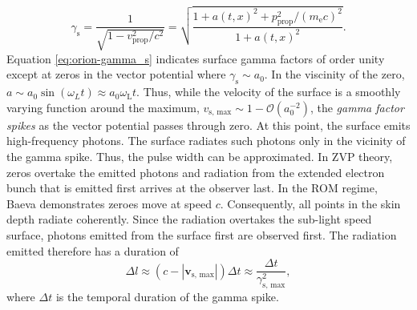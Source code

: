 \begin{equation}\label{eq:orion-gamma_s}
	\gamma_\mathrm{s} = \frac{1}{\sqrt{1-v_\mathrm{prop}^2/c^2}} = \sqrt{ \frac{1 + a(t,x)^2 +  p_\mathrm{prop}^2/(m_\mathrm{e}c)^2}{1 + a(t,x)^2}}.
\end{equation}
Equation \ref{eq:orion-gamma_s} indicates surface gamma factors of order unity except at zeros in the vector potential where $\gamma_\mathrm{s} \sim a_0$. In the viscinity of the zero, $a \sim a_0\sin(\omega_L t) \approx a_0\omega_\mathrm{L}t$. Thus, while the velocity of the surface is a smoothly varying function around the maximum, $v_\mathrm{s,\, max} \sim 1 - \mathcal{O}(a_0^{-2})$, the \textit{gamma factor spikes} as the vector potential passes through zero. At this point, the surface emits high-frequency photons. The surface radiates such photons only in the vicinity of the gamma spike. Thus, the pulse width can be approximated. In ZVP theory, zeros overtake the emitted photons and radiation from the extended electron bunch that is emitted first arrives at the observer last. In the ROM regime, Baeva demonstrates zeroes move at speed $c$. Consequently, all points in the skin depth radiate coherently. Since the radiation overtakes the sub-light speed surface, photons emitted from the surface first are observed first. The radiation emitted therefore has a duration of
\begin{equation}
	\Delta l \approx (c-|\mathbf{v}_\mathrm{s,\, max}|)\Delta t \approx \frac{\Delta t}{\gamma_\mathrm{s,\, max}^2},
\end{equation}
where $\Delta t$ is the temporal duration of the gamma spike. 


